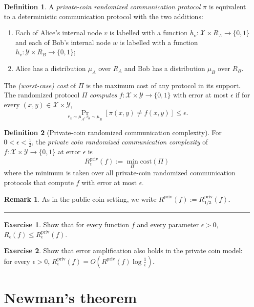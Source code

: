 \documentclass[11pt,oneside]{book}
\theoremstyle{plain}
\theoremstyle{definition}
\newtheorem{definition}{Definition}
\newtheorem{exercise}{Exercise}
\newtheorem{remark}{Remark}
\theoremstyle{plain}
\newcommand{\calX}{\mathcal{X}}
\newcommand{\calY}{\mathcal{Y}}
\newcommand{\cost}{\mathrm{cost}}
\newcommand{\Rpriv}{R^{\mathrm{priv}}}
\newcommand{\exercises}{\bigskip \noindent\rule{8cm}{0.4pt} \medskip}
\begin{document}
\begin{definition}
	A \emph{private-coin randomized communication protocol} $\pi$ is equivalent to a deterministic communication protocol with the two additions: 
	\begin{enumerate}
		\item Each of Alice's internal node $v$ is labelled with a function $h_v : \calX \times R_A \to \{0,1\}$ and each of Bob's internal node $w$ is labelled with a function $h_v : \calY \times R_B \to \{0,1\}$; 
		\item Alice has a distribution $\mu_A$ over $R_A$ and Bob has a distribution $\mu_B$ over $R_B$.
	\end{enumerate}
	The \emph{(worst-case) cost} of $\Pi$ is the maximum cost of any protocol in its support. The randomized protocol $\Pi$ \emph{computes} $f : \calX \times \calY \to \{0,1\}$ with error at most $\epsilon$ if for every $(x,y) \in \calX \times \calY$,
	\[
	\Pr_{r_a \sim \mu_A, r_b \sim \mu_B}[ \pi(x,y) \neq f(x,y) ] \le \epsilon.
	\]
\end{definition}


\begin{definition}[Private-coin randomized communication complexity]
	For $0 < \epsilon < \frac12$, the \emph{private coin randomized communication complexity} of $f : \calX \times \calY \to \{0,1\}$ at error $\epsilon$ is
	\[
	\Rpriv_\epsilon(f) := \min_{\Pi} \cost(\Pi)
	\]
	where the minimum is taken over all private-coin randomized communication protocols that compute $f$ with error at most $\epsilon$.
\end{definition}

\begin{remark}
	As in the public-coin setting, we write $\Rpriv(f) := \Rpriv_{1/3}(f)$.
\end{remark}
\exercises

\begin{exercise}
	Show that for every function $f$ and every parameter $\epsilon > 0$, 
	$R_\epsilon(f) \le \Rpriv_\epsilon(f)$.
\end{exercise}

\begin{exercise}
	Show that error amplification also holds in the private coin model: for every $\epsilon > 0$, $\Rpriv_\epsilon(f) = O(\Rpriv(f) \log \frac1\epsilon)$.
\end{exercise}


 
\section{Newman's theorem}
\end{document}
